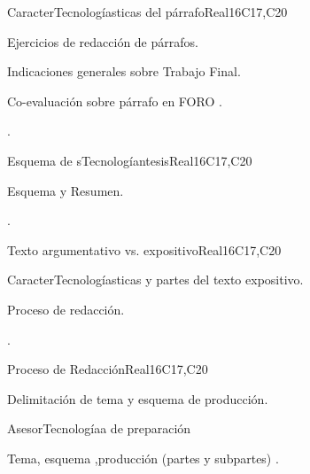 \begin{syllabus}
\begin{unit}{CaracterTecnologíasticas del párrafo}{}{Real}{16}{C17,C20}
  \begin{topics}
      \item Ejercicios de redacción de párrafos.
      \item Indicaciones generales sobre Trabajo Final.
      \item Co-evaluación sobre párrafo en FORO .
  \end{topics}

  \begin{learningoutcomes}
   \item .%
  \end{learningoutcomes}
\end{unit}

\begin{unit}{Esquema de sTecnologíantesis}{}{Real}{16}{C17,C20}
  \begin{topics}
      \item Esquema y Resumen.
  \end{topics}

  \begin{learningoutcomes}
   \item .%
  \end{learningoutcomes}
\end{unit}

\begin{unit}{Texto argumentativo vs. expositivo}{}{Real}{16}{C17,C20}
  \begin{topics}
      \item CaracterTecnologíasticas y partes del texto expositivo.
      \item Proceso de redacción.
  \end{topics}

  \begin{learningoutcomes}
   \item .%
  \end{learningoutcomes}
\end{unit}

\begin{unit}{Proceso de Redacción}{}{Real}{16}{C17,C20}
  \begin{topics}
      \item Delimitación de tema y esquema de producción.
      \item AsesorTecnologíaa de preparación
      \item Tema, esquema ,producción (partes y subpartes) .
  \end{topics}


\end{unit}
\end{syllabus}
